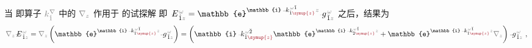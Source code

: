 当  即算子 $\mathcolor{gray}{k^\nabla_{\check{1}}}$ 中的 $\mathcolor{gray}{\nabla_z}$ 作用于  的试探解  即 $
\Xint{\mathcolor{gray}{-}}{25}{E}^{\;\!\mathcolor{gray}{\omega}}_{\;\! \hat{1} \mathcolor{gray}{z}} = \mathbb{e}^{\mathbb{i} \Xint{\begin{smallmatrix} ~ \\ {}^{}_{\mathcolor{gray}{-}} \\ ~ \end{smallmatrix}}{15}{k}_{\hat{1} \textcolor{Maroon}{\symup{z}}}^{\;\! \mathcolor{gray}{\omega} \breve{1}} \mathcolor{gray}{z}} \Xint{{}^{}_{\mathcolor{gray}{-}}}{10}{g}^{\;\!\mathcolor{gray}{\omega}}_{\;\! \breve{1} \mathcolor{gray}{z}}$ 之后，结果为
\begin{align} \label{eq:matrix_exp-dz}
	\mathcolor{gray}{\nabla_z} \Xint{\mathcolor{gray}{-}}{30}{E}^{\;\!\mathcolor{gray}{\omega}}_{\;\! \hat{1} \mathcolor{gray}{z}} = \mathcolor{gray}{\nabla_z} \left( \mathbb{e}^{\mathbb{i} \Xint{\begin{smallmatrix} ~ \\ {}^{}_{\mathcolor{gray}{-}} \\ ~ \end{smallmatrix}}{15}{k}_{\hat{1} \textcolor{Maroon}{\symup{z}}}^{\;\! \mathcolor{gray}{\omega} \breve{1}} \mathcolor{gray}{z}} \Xint{{}^{}_{\mathcolor{gray}{-}}}{10}{g}^{\;\!\mathcolor{gray}{\omega}}_{\;\! \breve{1} \mathcolor{gray}{z}} \right) = \left( \mathbb{i} \Xint{\begin{smallmatrix} ~ \\ {}^{}_{\mathcolor{gray}{-}} \\ ~ \end{smallmatrix}}{15}{k}_{\hat{1} \textcolor{Maroon}{\symup{z}}}^{\;\! \mathcolor{gray}{\omega} \breve{2}} \mathbb{e}^{\mathbb{i} \Xint{\begin{smallmatrix} ~ \\ {}^{}_{\mathcolor{gray}{-}} \\ ~ \end{smallmatrix}}{15}{k}_{\breve{2} \textcolor{Maroon}{\symup{z}}}^{\;\! \mathcolor{gray}{\omega} \breve{1}} \mathcolor{gray}{z}} + \mathbb{e}^{\mathbb{i} \Xint{\begin{smallmatrix} ~ \\ {}^{}_{\mathcolor{gray}{-}} \\ ~ \end{smallmatrix}}{15}{k}_{\hat{1} \textcolor{Maroon}{\symup{z}}}^{\;\! \mathcolor{gray}{\omega} \breve{1}} \mathcolor{gray}{z}} \mathcolor{gray}{\nabla_z} \right) \Xint{{}^{}_{\mathcolor{gray}{-}}}{10}{g}^{\;\!\mathcolor{gray}{\omega}}_{\;\! \breve{1} \mathcolor{gray}{z}} ~,
\end{align}
